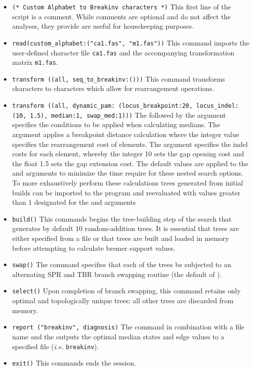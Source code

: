 \begin{itemize}
\item \texttt{(* Custom Alphabet to Breakinv characters  *)} This first line of the script is a comment. While comments are optional and do not affect the analyses, they provide are useful for housekeeping purposes.
\item \texttt{read(custom\_alphabet:("ca1.fas", "m1.fas"))} This command imports the user-defined  character file \texttt{ca1.fas} and the accompanying transformation matrix \texttt{m1.fas}.
\item \texttt{transform ((all, seq\_to\_breakinv:()))} This command transforms  characters to  characters which allow for rearrangement operations.
\item \texttt{transform ((all, dynamic\_pam: (locus\_breakpoint:20, locus\_indel:(10, 1.5), median:1, swap\_med:1)))}  The  followed by the argument  specifies the conditions to be applied when calculating medians.  The argument  applies a breakpoint distance calculation where the integer value specifies the rearrangement cost of  elements. The argument  specifies the indel costs for each  element, whereby the integer 10 sets the gap opening cost and the float 1.5 sets the gap extension cost.  The default values are applied to the  and  arguments to minimize the time require for these nested search options.   To more exhaustively perform these calculations trees generated from initial builds can be imported to the program and reevaluated with values greater than 1 designated for the  and  arguments
\item \texttt{build()} This commands begins the tree-building step of the search that generates by default 10 random-addition trees.  It is essential that trees are either specified from a file or that trees are built and loaded in memory before attempting to calculate bremer support values.
\item \texttt{swap()} The  command specifies that each of the trees be subjected to an alternating SPR and TBR branch swapping routine (the default of \poy).
\item \texttt{select()} Upon completion of branch swapping, this command retains only optimal and topologically unique trees; all other trees are discarded from memory. 
\item \texttt{report ("breakinv", diagnosis)}  The  command in combination with a file name and the  outputs the optimal median states and edge values to a specified file (\emph{i.e.} \texttt{breakinv}). 
\item \texttt{exit()} This commands ends the \poy session.
\end{itemize}


